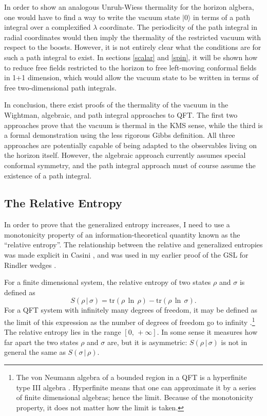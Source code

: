 \documentclass{article}
\begin{document}
In order to show an analogous Unruh-Wiess thermality for the horizon algbera, one would have to find a way to write the vacuum state $|0\rangle$ in terms of a path integral over a complexified $\lambda$ coordinate.  The periodicity of the path integral in radial coordinates would then imply the thermality of the restricted vacuum with respect to the boosts.  However, it is not entirely clear what the conditions are for such a path integral to exist.  In sections \ref{scalar} and \ref{spin}, it will be shown how to reduce free fields restricted to the horizon to free left-moving conformal fields in 1+1 dimension, which would allow the vacuum state to be written in terms of free two-dimensional path integrals.

In conclusion, there exist proofs of the thermality of the vacuum in the Wightman, algebraic, and path integral approaches to QFT.  The first two approaches prove that the vacuum is thermal in the KMS sense, while the third is a formal demonstration using the less rigorous Gibbs definition.  All three approaches are potentially capable of being adapted to the observables living on the horizon itself.  However, the algebraic approach currently assumes special conformal symmetry, and the path integral approach must of course assume the existence of a path integral.

\subsection{The Relative Entropy}\label{relative}

In order to prove that the generalized entropy increases, I need to use a monotonicity property of an information-theoretical quantity known as the ``relative entropy''.  The relationship between the relative and generalized entropies was made explicit in Casini \cite{casini08}, and was used in my earlier proof of the GSL for Rindler wedges \cite{rindler}.

For a finite dimensional system, the relative entropy of two states $\rho$ and $\sigma$ is defined as
\begin{equation}\label{relIII}
S(\rho\,|\,\sigma) = \mathrm{tr}(\rho\,\ln\,\rho) - \mathrm{tr}(\rho\,\ln\,\sigma).
\end{equation}
For a QFT system with infinitely many degrees of freedom, it may be defined as the limit of this expression as the number of degrees of freedom go to infinity \cite{araki75}.\footnote{The von Neumann algebra of a bounded region in a QFT is a hyperfinite type III algebra \cite{BAF87}.  Hyperfinite means that one can approximate it by a series of finite dimensional algebras; hence the limit.  Because of the monotonicity property, it does not matter how the limit is taken.}  The relative entropy lies in the range $[0,\,+\infty]$.  In some sense it measures how far apart the two states $\rho$ and $\sigma$ are, but it is asymmetric: $S(\rho\,|\,\sigma)$ is not in general the same as $S(\sigma\,|\,\rho)$.
\end{document}
